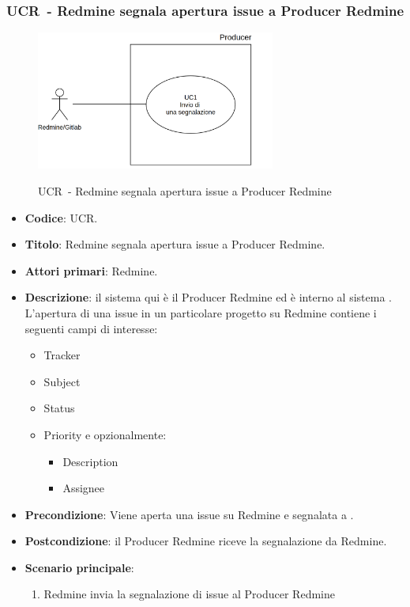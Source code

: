 \subsubsection{UCR\theuccount\ - Redmine segnala apertura issue a Producer Redmine}
    \begin{figure}[H]
		\centering
		\includegraphics[width=0.7\textwidth]{img/UC1.png}\\
		\caption{UCR\theuccount\ - Redmine segnala apertura issue a Producer
			Redmine}
	\end{figure}
	\begin{itemize}
		\item \textbf{Codice}: UCR\theuccount.
		\item \textbf{Titolo}: Redmine segnala apertura issue a Producer Redmine.
		\item \textbf{Attori primari}: Redmine.
		\item \textbf{Descrizione}:
		 il sistema qui è il Producer Redmine ed è interno al sistema \progetto.
		 L'apertura di una issue in un particolare progetto su Redmine
		 contiene i seguenti campi di interesse:
		 \begin{itemize}
		 	\item Tracker
		 	\item Subject
		 	\item Status
		 	\item Priority e opzionalmente:
		 	\begin{itemize}
		 		\item Description
		 		\item Assignee
		 	\end{itemize}
		 \end{itemize}
		\item \textbf{Precondizione}: Viene aperta una issue su Redmine e
		segnalata a \progetto.
		\item \textbf{Postcondizione}: il Producer Redmine riceve la segnalazione da Redmine.
		\item \textbf{Scenario principale}: 
		\begin{enumerate}
			\item Redmine invia la segnalazione di issue al Producer Redmine
		\end{enumerate}
		
	\end{itemize}
